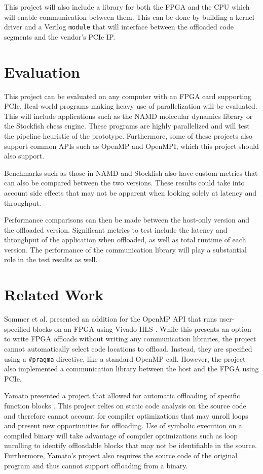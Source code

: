 \documentclass[11pt]{article}
\begin{document}
This project will also include a library for both the FPGA and the CPU which will enable communication between them. 
This can be done by building a kernel driver and a Verilog \texttt{module} that will interface between the offloaded code segments and the vendor's PCIe IP.

\section{Evaluation}

This project can be evaluated on any computer with an FPGA card supporting PCIe.
Real-world programs making heavy use of parallelization will be evaluated.
This will include applications such as the NAMD molecular dynamics library \cite{phillips2005scalable} or the Stockfish chess engine.
These programs are highly parallelized and will test the pipeline heuristic of the prototype.
Furthermore, some of these projects also support common APIs such as OpenMP and OpenMPI, which this project should also support.

Benchmarks such as those in NAMD and Stockfish also have custom metrics that can also be compared between the two versions.
These results could take into account side effects that may not be apparent when looking solely at latency and throughput.

Performance comparisons can then be made between the host-only version and the offloaded version.
Significant metrics to test include the latency and throughput of the application when offloaded, as well as total runtime of each version.
The performance of the communication library will play a substantial role in the test results as well.

\section{Related Work}

Sommer et al. presented an addition for the OpenMP API that runs user-specified blocks on an FPGA using Vivado HLS \cite{sommer2017openmp}. While this presents an option to write FPGA offloads without writing any communication libraries, the project cannot automatically select code locations to offload. Instead, they are specified using a \texttt{\#pragma} directive, like a standard OpenMP call. However, the project also implemented a communication library between the host and the FPGA using PCIe.

Yamato presented a project that allowed for automatic offloading of specific function blocks \cite{yamato2021automatic}.
This project relies on static code analysis on the source code and therefore cannot account for compiler optimizations that may unroll loops and present new opportunities for offloading.
Use of symbolic execution on a compiled binary will take advantage of compiler optimizations such as loop unrolling to identify offloadable blocks that may not be identifiable in the source.
Furthermore, Yamato's project also requires the source code of the original program and thus cannot support offloading from a binary.
\end{document}
